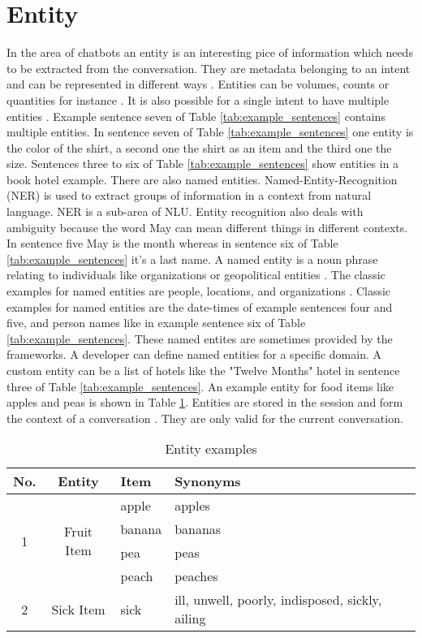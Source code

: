 \section{Entity} \label{sec:entity}
In the area of chatbots an entity is an interesting pice of information which needs to be 
extracted from the conversation.
They are metadata belonging to an intent and can be represented in different ways \cite{buiildChatbotsPython}.
Entities can be volumes, counts or quantities for instance \cite{buiildChatbotsPython}.
It is also possible for a single intent to have multiple entities \cite{buiildChatbotsPython}.
Example sentence seven of Table \ref{tab:example_sentences} contains multiple entities.
In sentence seven of Table \ref{tab:example_sentences} one entity is the color of the shirt, 
a second one the shirt as an item and the third one the size.
Sentences three to six of Table \ref{tab:example_sentences} show entities in a book hotel example.
There are also named entities.
Named-Entity-Recognition (NER) is used to extract groups of information in a context from natural language.
NER is a sub-area of NLU.
Entity recognition also deals with ambiguity because the word May can mean different things in different contexts.
In sentence five May is the month whereas in sentence six of Table \ref{tab:example_sentences} it's a last name. 
A named entity is a noun phrase relating to individuals like organizations or geopolitical entities \cite{singhbuilding}.
The classic examples for named entities are people, locations, and organizations \cite{geyer2016named}.
Classic examples for named entities are the date-times of example sentences four and five,
and person names like in example sentence six of Table \ref{tab:example_sentences}.
These named entites are sometimes provided by the frameworks.
A developer can define named entities for a specific domain.
A custom entity can be a list of hotels like the "Twelve Months" 
hotel in sentence three of Table \ref{tab:example_sentences}.
An example entity for food items like apples and peas is shown in Table \ref{tab:entityexampledialog}.
Entities are stored in the session and form the context of a conversation \cite{singhbuilding}.
They are only valid for the current conversation.

\begin{table}[H]
    \centering
    \begin{tabular}{ c | c | l | l }
  No. & Entity & Item & Synonyms \\ \hline \hline
  \multirow{4}{*}{1} & \multirow{4}{*}{Fruit Item} & apple & apples \\
       & & banana & bananas\\
       & & pea & peas \\ 
       & & peach & peaches \\ \hline
    2 & Sick Item & sick & ill, unwell, poorly, indisposed, sickly, ailing \\
    \hline
\end{tabular}
    \caption{Entity examples} \label{tab:entityexampledialog}
\end{table} \noindent


